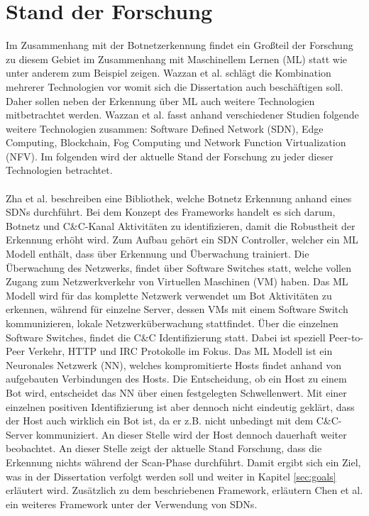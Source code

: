 \section{Stand der Forschung}
\label{sec:research}

Im Zusammenhang mit der Botnetzerkennung findet ein Großteil der Forschung zu diesem Gebiet im Zusammenhang mit Maschinellem Lernen (ML) statt wie
unter anderem zum Beispiel \cite{SAlrayes2022ModelingOB,DBLP:journals/comcom/Alani22,Habtamu2022ASR} zeigen.
Wazzan et al. \cite{Wazzan2021InternetOT} schlägt die Kombination mehrerer Technologien vor womit sich die Dissertation auch beschäftigen soll.
Daher sollen neben der Erkennung über ML auch weitere Technologien mitbetrachtet werden. Wazzan et al. fasst anhand verschiedener Studien folgende 
weitere Technologien zusammen: Software Defined Network (SDN), Edge Computing, Blockchain, Fog Computing und Network Function Virtualization (NFV). 
Im folgenden wird der aktuelle Stand der Forschung zu jeder dieser Technologien betrachtet. \\ \\ Zha et al. \cite{DBLP:conf/cns/Zha0GMC19} beschreiben 
eine Bibliothek, welche Botnetz Erkennung anhand eines SDNs durchführt. Bei dem Konzept des Frameworks handelt es sich darum, Botnetz und C&C-Kanal Aktivitäten 
zu identifizieren, damit die Robustheit der Erkennung erhöht wird. Zum Aufbau gehört ein SDN Controller, welcher ein ML Modell enthält, dass über Erkennung und 
Überwachung trainiert. Die Überwachung des Netzwerks, findet über Software Switches statt, welche vollen Zugang zum Netzwerkverkehr von Virtuellen Maschinen (VM) haben.
Das ML Modell wird für das komplette Netzwerk verwendet um Bot Aktivitäten zu erkennen, während für einzelne Server, dessen VMs mit einem Software Switch kommunizieren, 
lokale Netzwerküberwachung stattfindet. Über die einzelnen Software Switches, findet die C\&C Identifizierung statt. Dabei ist speziell Peer-to-Peer Verkehr, HTTP und IRC
Protokolle im Fokus. Das ML Modell ist ein Neuronales Netzwerk (NN), welches kompromitierte Hosts findet anhand von aufgebauten Verbindungen des Hosts. Die Entscheidung, ob ein 
Host zu einem Bot wird, entscheidet das NN über einen festgelegten Schwellenwert. Mit einer einzelnen positiven Identifizierung ist aber dennoch nicht eindeutig geklärt, dass der
Host auch wirklich ein Bot ist, da er z.B. nicht unbedingt mit dem C\&C-Server kommuniziert. An dieser Stelle wird der Host dennoch dauerhaft weiter beobachtet. An dieser Stelle
zeigt der aktuelle Stand Forschung, dass die Erkennung nichts während der Scan-Phase durchführt. Damit ergibt sich ein Ziel, was in der Dissertation verfolgt werden soll und weiter
in Kapitel \ref{sec:goals} erläutert wird. 
Zusätzlich zu dem beschriebenen Framework, erläutern Chen et al. \cite{Chen2017BotGuardLR} ein weiteres Framework unter der Verwendung von SDNs. 
